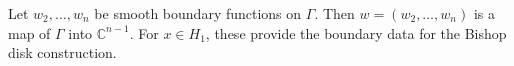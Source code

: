 
Let $w_2, \ldots, w_n$ be smooth boundary functions on $\Gamma$. Then $w = (w_2, \ldots, w_n)$ is a map of $\Gamma$ into $\mathbb{C}^{n-1}$. For $x \in H_1$, these provide the boundary data for the Bishop disk construction.
